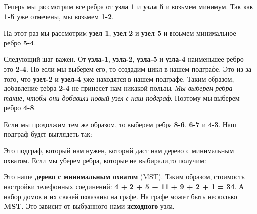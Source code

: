 
\begin{center}
\end{center}

Теперь мы рассмотрим все ребра от \textbf{узла 1} и \textbf{узла 5} и возьмем минимум. Так как \textbf{1-5} уже отмечены, мы возьмем \textbf{1-2}.

\begin{center}
\end{center}

На этот раз мы рассмотрим \textbf{узел 1}, \textbf{узел 2} и \textbf{узел 5} и возьмем минимальное ребро \textbf{5-4}.

\begin{center}
\end{center}

Следующий шаг важен. От \textbf{узла-1}, \textbf{узла-2}, \textbf{узла-5} и \textbf{узла-4} наименьшее ребро - это \textbf{2-4}. Но если мы выберем его, то создадим цикл в нашем подграфе. Это из-за того, что \textbf{узел-2} и \textbf{узел-4} уже находятся в нашем подграфе. Таким образом, добавление ребра \textbf{2-4} не принесет нам никакой пользы. \textit{Мы выберем ребра такие, чтобы они добавили новый узел в наш подграф}. Поэтому мы выберем ребро \textbf{4-8}.

\begin{center}
\end{center}

Если мы продолжим тем же образом, то выберем ребра \textbf{8-6}, \textbf{6-7} и \textbf{4-3}. Наш подграф будет выглядеть так:

\begin{center}
\end{center}

Это подграф, который нам нужен, который даст нам дерево с минимальным охватом. Если мы уберем ребра, которые не выбирали,то получим:

\begin{center}
\end{center}

Это наше \textbf{дерево с минимальным охватом} (MST). Таким образом, стоимость настройки телефонных соединений: \textbf{4 + 2 + 5 + 11 + 9 + 2 + 1 = 34}. А набор домов и их связей показаны на графе. На графе может быть несколько \textbf{MST}. Это зависит от выбранного нами \textbf{исходного} узла.

